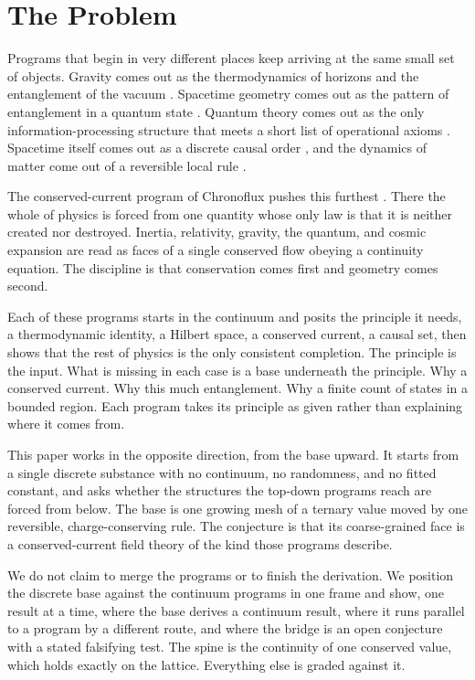 \section{The Problem}

Programs that begin in very different places keep arriving at the same small set of objects. Gravity comes out as the thermodynamics of horizons and the entanglement of the vacuum \cite{jacobson1995, padmanabhan2010}. Spacetime geometry comes out as the pattern of entanglement in a quantum state \cite{vanraamsdonk2010}. Quantum theory comes out as the only information-processing structure that meets a short list of operational axioms \cite{chiribella2011, hardy2001}. Spacetime itself comes out as a discrete causal order \cite{bombelli1987}, and the dynamics of matter come out of a reversible local rule \cite{thooft2016, dariano2014}.

The conserved-current program of Chronoflux pushes this furthest \cite{herbert2025chronoflux}. There the whole of physics is forced from one quantity whose only law is that it is neither created nor destroyed. Inertia, relativity, gravity, the quantum, and cosmic expansion are read as faces of a single conserved flow obeying a continuity equation. The discipline is that conservation comes first and geometry comes second.

Each of these programs starts in the continuum and posits the principle it needs, a thermodynamic identity, a Hilbert space, a conserved current, a causal set, then shows that the rest of physics is the only consistent completion. The principle is the input. What is missing in each case is a base underneath the principle. Why a conserved current. Why this much entanglement. Why a finite count of states in a bounded region. Each program takes its principle as given rather than explaining where it comes from.

This paper works in the opposite direction, from the base upward. It starts from a single discrete substance with no continuum, no randomness, and no fitted constant, and asks whether the structures the top-down programs reach are forced from below. The base is one growing mesh of a ternary value moved by one reversible, charge-conserving rule. The conjecture is that its coarse-grained face is a conserved-current field theory of the kind those programs describe.

We do not claim to merge the programs or to finish the derivation. We position the discrete base against the continuum programs in one frame and show, one result at a time, where the base derives a continuum result, where it runs parallel to a program by a different route, and where the bridge is an open conjecture with a stated falsifying test. The spine is the continuity of one conserved value, which holds exactly on the lattice. Everything else is graded against it.
